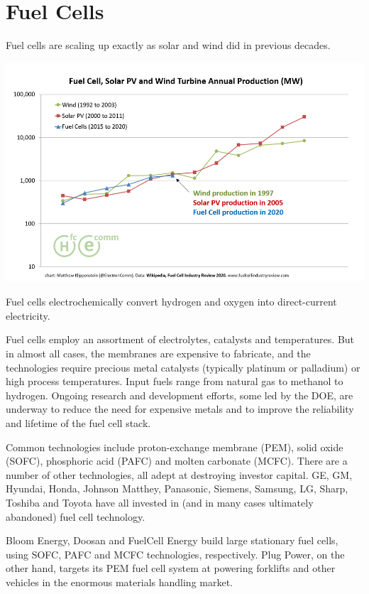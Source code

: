 \documentclass[
]{book}
\begin{document}
\hypertarget{fuel-cells}{%
\chapter{Fuel Cells}\label{fuel-cells}}

Fuel cells are scaling up exactly as solar and wind did in previous decades.

\includegraphics{fig/fuel-cell_catch-up.png}

Fuel cells electrochemically convert hydrogen and oxygen into direct-current electricity.

Fuel cells employ an assortment of electrolytes, catalysts and temperatures. But in almost all cases, the membranes are expensive to fabricate, and the technologies require precious metal catalysts (typically platinum or palladium) or high process temperatures. Input fuels range from natural gas to methanol to hydrogen. Ongoing research and development efforts, some led by the DOE, are underway to reduce the need for expensive metals and to improve the reliability and lifetime of the fuel cell stack.

Common technologies include proton-exchange membrane (PEM), solid oxide (SOFC), phosphoric acid (PAFC) and molten carbonate (MCFC). There are a number of other technologies, all adept at destroying investor capital. GE, GM, Hyundai, Honda, Johnson Matthey, Panasonic, Siemens, Samsung, LG, Sharp, Toshiba and Toyota have all invested in (and in many cases ultimately abandoned) fuel cell technology.

Bloom Energy, Doosan and FuelCell Energy build large stationary fuel cells, using SOFC, PAFC and MCFC technologies, respectively. Plug Power, on the other hand, targets its PEM fuel cell system at powering forklifts and other vehicles in the enormous materials handling market.
\end{document}

